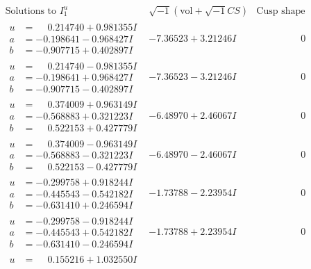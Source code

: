 \documentclass[1p]{elsarticle_modified}
\theoremstyle{definition}
\newcommand{\I}{\sqrt{-1}}
\begin{document}
$$\begin{array}{c|c|c}  
\text{Solutions to }I^u_{1}& \I (\text{vol} + \sqrt{-1}CS) & \text{Cusp shape}\\
 \hline 
\begin{aligned}
u &= \phantom{-}0.214740 + 0.981355 I \\
a &= -0.198641 - 0.968427 I \\
b &= -0.907715 + 0.402897 I\end{aligned}
 & -7.36523 + 3.21246 I & \phantom{-0.000000 } 0 \\ \hline\begin{aligned}
u &= \phantom{-}0.214740 - 0.981355 I \\
a &= -0.198641 + 0.968427 I \\
b &= -0.907715 - 0.402897 I\end{aligned}
 & -7.36523 - 3.21246 I & \phantom{-0.000000 } 0 \\ \hline\begin{aligned}
u &= \phantom{-}0.374009 + 0.963149 I \\
a &= -0.568883 + 0.321223 I \\
b &= \phantom{-}0.522153 + 0.427779 I\end{aligned}
 & -6.48970 + 2.46067 I & \phantom{-0.000000 } 0 \\ \hline\begin{aligned}
u &= \phantom{-}0.374009 - 0.963149 I \\
a &= -0.568883 - 0.321223 I \\
b &= \phantom{-}0.522153 - 0.427779 I\end{aligned}
 & -6.48970 - 2.46067 I & \phantom{-0.000000 } 0 \\ \hline\begin{aligned}
u &= -0.299758 + 0.918244 I \\
a &= -0.445543 - 0.542182 I \\
b &= -0.631410 + 0.246594 I\end{aligned}
 & -1.73788 - 2.23954 I & \phantom{-0.000000 } 0 \\ \hline\begin{aligned}
u &= -0.299758 - 0.918244 I \\
a &= -0.445543 + 0.542182 I \\
b &= -0.631410 - 0.246594 I\end{aligned}
 & -1.73788 + 2.23954 I & \phantom{-0.000000 } 0 \\ \hline\begin{aligned}
u &= \phantom{-}0.155216 + 1.032550 I \\

\end{aligned}
\end{array}$$
\end{document}
